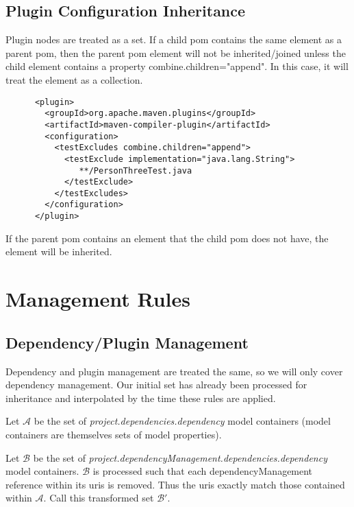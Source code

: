 \documentclass[12pt]{amsart}
\begin{document}
\subsection{Plugin Configuration Inheritance}
Plugin nodes are treated as a set. If a child pom contains the same element as a parent pom, then the parent pom element will not be inherited/joined unless the child element contains a property combine.children="append". In this case, it will treat the element as a collection.

\begin{verbatim}
      <plugin>
        <groupId>org.apache.maven.plugins</groupId>
        <artifactId>maven-compiler-plugin</artifactId>
        <configuration>
          <testExcludes combine.children="append">
            <testExclude implementation="java.lang.String">
               **/PersonThreeTest.java
            </testExclude>
          </testExcludes>
        </configuration>
      </plugin>
\end{verbatim}

If the parent pom contains an element that the child pom does not have, the element will be inherited.



\section{Management Rules}
\subsection{Dependency/Plugin Management}
Dependency and plugin management are treated the same, so we will only cover dependency management. Our initial set has already been processed for inheritance and interpolated by the time these rules are applied. 

Let \begin{math}\mathcal{A}\end{math} be the set of \emph{project.dependencies.dependency} model containers (model containers are themselves sets of model properties). 

Let \begin{math}\mathcal{B}\end{math} be the set of 
\emph{project.dependencyManagement.dependencies.dependency }model containers. \begin{math}\mathcal{B}\end{math} is processed such that each dependencyManagement reference within its uris is removed. Thus the uris exactly match those contained within \begin{math}\mathcal{A}\end{math}. Call this transformed set \begin{math} \mathcal{B'}\end{math}. 
\end{document}

